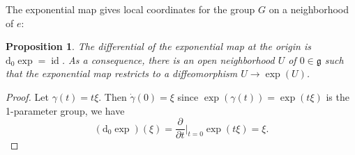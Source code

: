 \documentclass{article}
\newtheorem{proposition}[theorem]{Proposition}
\theoremstyle{remark}
\newtheorem{exercise}[theorem]{Exercise}
\newcommand{\R}{\mathbb{R}}
\newcommand{\C}{\mathbb{C}}
\newcommand\lie[1]{\mathfrak{#1}}
\newcommand{\g}{\lie{g}}
\newcommand{\on}{\operatorname}
\newcommand{\SU}{ \on{SU}}
\newcommand{\GL}{ \on{GL}}
\newcommand{\SL}{ \on{SL}}
\newcommand{\SO}{ \on{SO}}
\renewcommand{\d}{{\mbox{d}}}
\newcommand{\f}{\frac}
\newcommand{\p}{\partial}
\newcommand{\mf}{\mathfrak}
\begin{document}
The exponential map gives local coordinates for the group $G$ on a
neighborhood of $e$:
%
\begin{proposition}
The differential of the exponential map at the origin is $\d_0\exp=\on{id}$. As a consequence, 
there is an open neighborhood $U$ of $0\in\g$ such that the exponential map restricts to a diffeomorphism 
$U\to \exp(U)$. 
\end{proposition}
\begin{proof}
Let $\gamma(t)=t\xi$. Then $\dot{\gamma}(0)=\xi$ 
since $\exp(\gamma(t))=\exp(t\xi)$ is the 1-parameter group, we have 
\[ (\d_0\exp)(\xi)=\f{\p}{\p t}|_{t=0} \exp(t\xi)=\xi.\] 
\end{proof}
%
%
\end{document}
